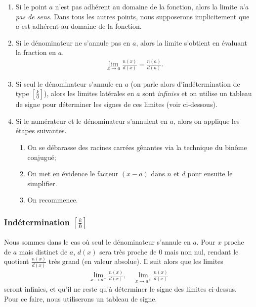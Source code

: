 \documentclass[main.tex]{subfiles}
\begin{document}
\begin{enumerate}
    \item Si le point $a$ n'est pas adhérent au domaine de la fonction, alors la limite \emph{n'a pas de sens}.
        Dans tous les autres points, nous supposerons implicitement que $a$ est adhérent au domaine de la fonction.
    \item Si le dénominateur ne s'annule pas en $a$,
        alors la limite s'obtient en évaluant la fraction en $a$.
        \begin{align}
            \lim_{x \to a} \frac {n(x)} {d(x)} = \frac {n(a)} {d(a)}.
        \end{align}
    \item Si seul le dénominateur s'annule en $a$
        (on parle alors d'indétermination de type $\left[\frac k 0\right]$),
        alors les limites latérales en $a$ sont \emph{infinies}
        et on utilise un tableau de signe pour déterminer les signes de ces limites
        (voir ci-dessous).
    \item Si le numérateur et le dénominateur s'annulent en $a$,
        alors on applique les étapes suivantes.
        \begin{enumerate}
            \item On se débarasse des racines carrées gênantes via la technique du binôme conjugué;
            \item On met en évidence le facteur $(x - a)$ dans $n$ et $d$ pour ensuite le simplifier.
            \item On recommence.
        \end{enumerate}
\end{enumerate}

\subsubsection{Indétermination $\left[\frac{k}{0}\right]$}

Nous sommes dans le cas où seul le dénominateur s'annule en $a$.
Pour $x$ proche de $a$ mais distinct de $a$,
$d(x)$ sera très proche de $0$ mais non nul,
rendant le quotient $\frac {n(x)} {d(x)}$ très grand (en valeur absolue).
Il suit alors que les limites
\begin{align}
    \lim_{x \to a^-} \frac {n(x)} {d(x)},
    \quad
    \lim_{x \to a^+} \frac {n(x)} {d(x)}
\end{align}
seront infinies,
et qu'il ne reste qu'à déterminer le signe des limites ci-dessus.
Pour ce faire,
nous utiliserons un tableau de signe.
\end{document}
